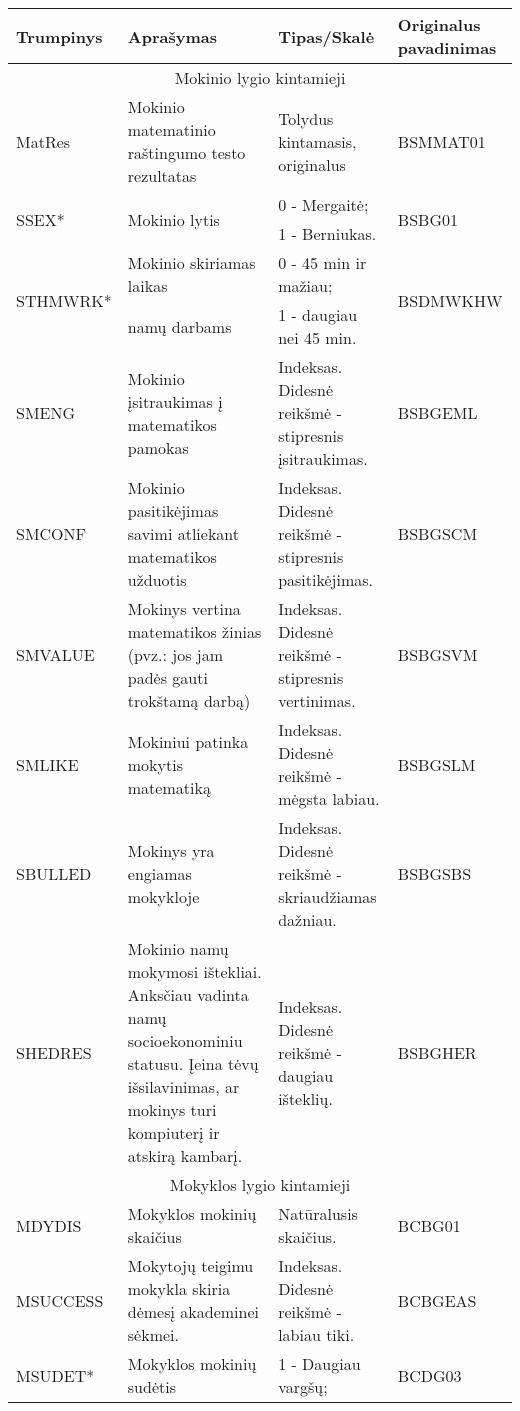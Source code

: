 \documentclass[12pt,a4paper]{article}
\begin{document}
\begin{small}
\begin{longtable}{| p{} | p{5cm} | p{5cm} | p{} |}
\hline
Trumpinys & Aprašymas & Tipas/Skalė & Originalus pavadinimas \\ \hline
\multicolumn{4}{|c|}{Mokinio lygio kintamieji} \\
\hline
MatRes & Mokinio matematinio raštingumo testo rezultatas & Tolydus kintamasis, originalus & BSMMAT01\\ \hline
\multirow{2}{*}{SSEX*} & \multirow{2}{*}{Mokinio lytis} & 0 - Mergaitė; & \multirow{2}{*}{BSBG01}\\
& & 1 - Berniukas. & \\ \hline
\multirow{2}{*}{STHMWRK*} & Mokinio skiriamas laikas & 0 - 45 min ir mažiau; & \multirow{2}{*}{BSDMWKHW}\\
& namų darbams & 1 - daugiau nei 45 min. & \\ \hline
SMENG & Mokinio įsitraukimas į matematikos pamokas & Indeksas. Didesnė reikšmė - stipresnis įsitraukimas. & BSBGEML\\ \hline
SMCONF & Mokinio pasitikėjimas savimi atliekant matematikos užduotis & Indeksas. Didesnė reikšmė - stipresnis pasitikėjimas. & BSBGSCM\\ \hline
SMVALUE & Mokinys vertina matematikos žinias (pvz.: jos jam padės gauti trokštamą darbą) & Indeksas. Didesnė reikšmė - stipresnis vertinimas. & BSBGSVM\\ \hline
SMLIKE & Mokiniui patinka mokytis matematiką & Indeksas. Didesnė reikšmė - mėgsta labiau. &BSBGSLM\\ \hline
SBULLED & Mokinys yra engiamas mokykloje & Indeksas. Didesnė reikšmė - skriaudžiamas dažniau. &BSBGSBS\\ \hline
SHEDRES & Mokinio namų mokymosi ištekliai. Anksčiau vadinta namų socioekonominiu statusu. Įeina tėvų išsilavinimas, ar mokinys turi kompiuterį ir atskirą kambarį. & Indeksas. Didesnė reikšmė - daugiau išteklių. &BSBGHER\\ \hline
\multicolumn{4}{|c|}{Mokyklos lygio kintamieji} \\
\hline
MDYDIS & Mokyklos mokinių skaičius & Natūralusis skaičius. & BCBG01\\ \hline
MSUCCESS & Mokytojų teigimu mokykla skiria dėmesį akademinei sėkmei. & Indeksas. Didesnė reikšmė - labiau tiki. &BCBGEAS\\ \hline
MSUDET* & Mokyklos mokinių sudėtis & 1 - Daugiau vargšų; & \multirow{3}{*}{BCDG03}\\

\end{longtable}
\end{small}
\end{document}
